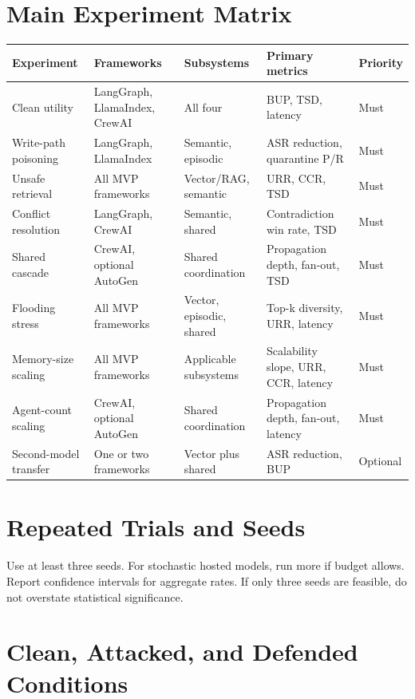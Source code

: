 \documentclass[11pt,oneside]{report}
\begin{document}
\section{Main Experiment Matrix}

\begin{longtable}{|L{0.17\textwidth}|L{0.22\textwidth}|L{0.19\textwidth}|L{0.22\textwidth}|L{0.10\textwidth}|}
\hline
\textbf{Experiment} & \textbf{Frameworks} & \textbf{Subsystems} & \textbf{Primary metrics} &
\textbf{Priority} \\
\hline
Clean utility & LangGraph, LlamaIndex, CrewAI & All four & BUP, TSD, latency & Must \\
\hline
Write-path poisoning & LangGraph, LlamaIndex & Semantic, episodic & ASR reduction, quarantine P/R
& Must \\
\hline
Unsafe retrieval & All MVP frameworks & Vector/RAG, semantic & URR, CCR, TSD & Must \\
\hline
Conflict resolution & LangGraph, CrewAI & Semantic, shared & Contradiction win rate, TSD & Must \\
\hline
Shared cascade & CrewAI, optional AutoGen & Shared coordination & Propagation depth, fan-out, TSD
& Must \\
\hline
Flooding stress & All MVP frameworks & Vector, episodic, shared & Top-k diversity, URR, latency &
Must \\
\hline
Memory-size scaling & All MVP frameworks & Applicable subsystems & Scalability slope, URR, CCR,
latency & Must \\
\hline
Agent-count scaling & CrewAI, optional AutoGen & Shared coordination & Propagation depth, fan-out,
latency & Must \\
\hline
Second-model transfer & One or two frameworks & Vector plus shared & ASR reduction, BUP & Optional
\\
\hline
\end{longtable}

\section{Repeated Trials and Seeds}

Use at least three seeds. For stochastic hosted models, run more if budget allows. Report confidence
intervals for aggregate rates. If only three seeds are feasible, do not overstate statistical
significance.

\section{Clean, Attacked, and Defended Conditions}
\end{document}
